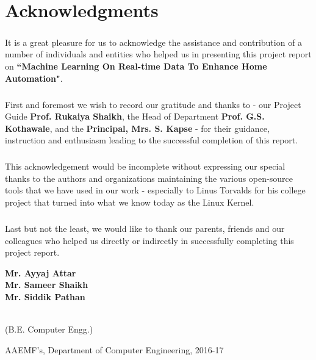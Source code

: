 \chapter*{Acknowledgments}
\thispagestyle{empty}
\paragraph{}
It is a great pleasure for us to acknowledge the assistance and contribution of a number of individuals and entities who helped us in presenting this project report on \textbf{``Machine Learning On Real-time Data To Enhance Home Automation"}.
\paragraph{}
First and foremost we wish to record our gratitude and thanks to - our Project Guide \textbf{Prof. Rukaiya Shaikh}, the Head of Department \textbf{Prof. G.S. Kothawale}, and the \textbf{Principal, Mrs. S. Kapse} - for their guidance, instruction and enthusiasm leading to the successful completion of this report.
\paragraph{}
This acknowledgement would be incomplete without expressing our special thanks to the authors and organizations maintaining the various open-source tools that we have used in our work - especially to Linus Torvalds for his college project that turned into what we know today as the Linux Kernel.
\paragraph{}
Last but not the least, we would like to thank our parents, friends and our colleagues who helped us directly or indirectly in successfully completing this project report.
\\
\begin{flushright}
\parbox[t][][l]{0.3\textwidth}{\textbf{Mr. Ayyaj Attar\\Mr. Sameer Shaikh\\Mr. Siddik Pathan\\}}\\
(B.E. Computer Engg.)
\end{flushright}

\vfill

\begin{center}
AAEMF’s, Department of Computer Engineering, 2016-17
\end{center}
\newpage
